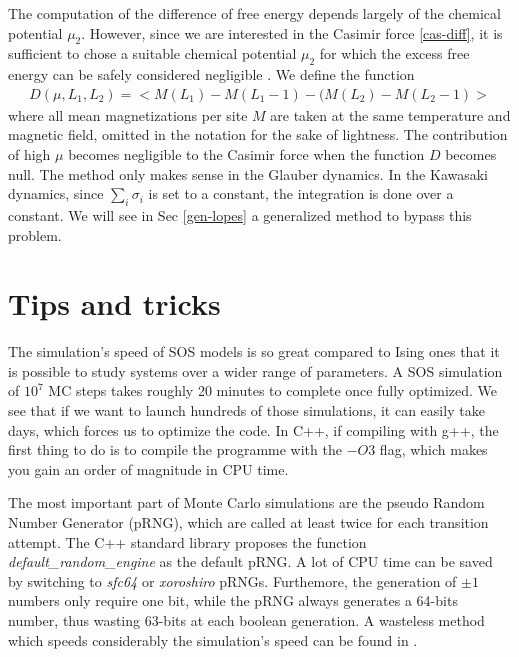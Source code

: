 {\color{red}
The computation of the difference of free energy depends largely of the chemical potential $\mu_2$. However, since we are interested in the Casimir force \eqref{cas-diff}, it is sufficient to chose a suitable chemical potential $\mu_2$ for which the excess free energy can be safely considered negligible \cite{lopes_cardozo_critical_2014} . We define the function
\begin{align}
    D(\mu,L_1,L_2) =  < M(L_1)-M(L_1-1) - (M(L_2)-M(L_2-1) >
    \label{function-d}
\end{align}
where all mean magnetizations per site $M$ are taken at the same temperature and magnetic field, omitted in the notation for the sake of lightness. The contribution of high $\mu$ becomes negligible to the Casimir force when the function $D$ becomes null.
}
{\color{red} The method only makes sense in the Glauber dynamics. In the Kawasaki dynamics, since $\sum_i \sigma_i$ is set to a constant, the integration is done over a constant. We will see in Sec \ref{gen-lopes} a generalized method to bypass this problem.}

\section{Tips and tricks}

The simulation's speed of SOS models is so great compared to Ising ones that it is possible to study systems over a wider range of parameters. A SOS simulation of $10^7$ MC steps takes roughly 20 minutes to complete once fully optimized. We see that if we want to launch hundreds of those simulations, it can easily take days, which forces us to optimize the code.
In C++, if compiling with g++, the first thing to do is to compile the programme with the $-O3$ flag, which makes you gain an order of magnitude in CPU time.

The most important part of Monte Carlo simulations are the pseudo Random Number Generator (pRNG), which are called at least twice for each transition attempt. The C++ standard library proposes the function \textit{default\_random\_engine} as the default pRNG. A lot of CPU time can be saved by switching to \textit{sfc64} or \textit{xoroshiro} pRNGs. Furthemore, the generation of $\pm1$ numbers only require one bit, while the pRNG always generates a 64-bits number, thus wasting 63-bits at each boolean generation. A wasteless method which speeds considerably the simulation's speed can be found in \cite{martin_ankerl_fast_nodate}.


